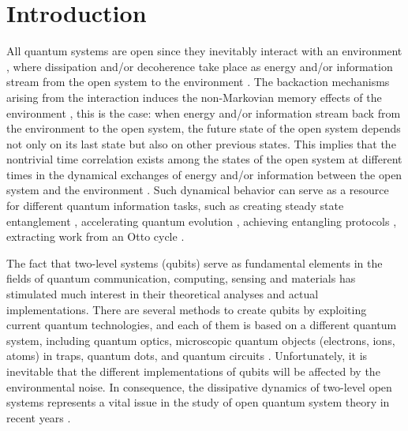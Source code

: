 \documentclass[
showpacs,  %
showkeys,  %
aps,       %
amsthm,    %
amsmath,   %
amsfonts,  %
amssymb    %
]{revtex4-1}          %
\begin{document}

\maketitle

\section{Introduction}
\label{intro}
All quantum systems are open since they inevitably interact with an environment \cite{Breuer2002}, where dissipation and/or decoherence take place as energy and/or information stream from the open system to the environment \cite{Breuer2002,Weiss2008}. The backaction mechanisms arising from the interaction induces the non-Markovian memory effects of the environment \cite{Caruso2014}, this is the case: when energy and/or information stream back from the environment to the open system, the future state of the open system depends not only on its last state but also on other previous states. This implies that the nontrivial time correlation exists among the states of the open system at different times in the dynamical exchanges of energy and/or information between the open system and the environment \cite{Fanchini2014,Addis2016,Mortezapour2018}. Such dynamical behavior can serve as a resource for different quantum information tasks, such as creating steady state entanglement \cite{Huelga2012}, accelerating quantum evolution \cite{Deffner2013,Wei2023}, achieving entangling protocols \cite{1Mirkin2019}, extracting work from an Otto cycle \cite{Thomas2018}.

The fact that two-level systems (qubits) serve as fundamental elements in the fields of quantum communication, computing, sensing and materials \cite{Stas2022,Noiri2022,Arunkumar2023,LiuXL2019} has stimulated much interest in their theoretical analyses and actual implementations. There are several methods to create qubits by exploiting current quantum technologies, and each of them is based on a different quantum system, including quantum optics, microscopic quantum objects (electrons, ions, atoms) in traps, quantum dots, and quantum circuits \cite{Majer2005,Berkley2003,Pashkin2003,Bellomo2007}. Unfortunately, it is inevitable that the different implementations of qubits will be affected by the environmental noise. In consequence, the dissipative dynamics of two-level open systems represents a vital issue in the study of open quantum system theory in recent years \cite{Ferraro2009,Laine2012,2Mirkin2019,Roy2023}.
\end{document}
